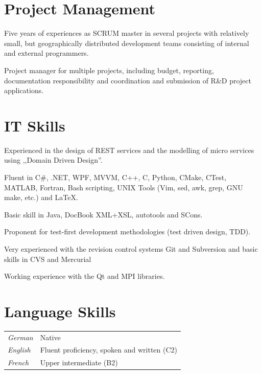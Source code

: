 \documentclass[line,11pt,a4paper]{../resume}
\begin{document}
\begin{resume}
\section{\mysidestyle Project Management}\vspace{6mm}
\begin{list2}
  \item Five years of experiences as SCRUM master in several projects with
    relatively small, but geographically distributed development teams
    consisting of internal and external programmers.

  \item Project manager for multiple projects, including budget, reporting,
    documentation responsibility and coordination and submission of R\&D
    project applications.
\end{list2}

\pagebreak
\section{\mysidestyle IT Skills}\vspace{6mm}
\begin{list2}
  \item Experienced in the design of REST services and the modelling of micro
    services using ,,Domain Driven Design''.
  \item Fluent in C\#, .NET, WPF, MVVM, C++, C, Python, CMake, CTest, MATLAB,
    Fortran, Bash scripting, UNIX Tools (Vim, sed, awk, grep, GNU make, etc.)
    and {\selectfont\LaTeX}.
  \item Basic skill in Java, DocBook XML+XSL, autotools and SCons.
  \item Proponent for test-first development methodologies (test driven design,
    TDD).
  \item Very experienced with the revision control systems Git and Subversion
    and basic skills in CVS and Mercurial
  \item Working experience with the Qt and MPI libraries.
\end{list2}

\section{\mysidestyle Language Skills}\vspace{2mm}
\begin{tabular}{@{}ll}
  \textsl{German}   & Native \\
  \textsl{English}  & Fluent proficiency, spoken and written (C2) \\
  \textsl{French}  & Upper intermediate (B2) \\
\end{tabular}


\end{resume}
\end{document}
